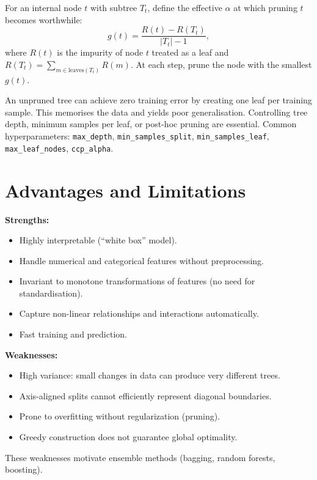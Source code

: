 \begin{proposition}
For an internal node $t$ with subtree $T_t$, define the effective $\alpha$ at which pruning $t$ becomes worthwhile:
\[
    g(t) = \frac{R(t) - R(T_t)}{|T_t| - 1},
\]
where $R(t)$ is the impurity of node $t$ treated as a leaf and $R(T_t) = \sum_{m \in \text{leaves}(T_t)} R(m)$. At each step, prune the node with the smallest $g(t)$.
\end{proposition}

\begin{warning}[title=\textbf{Overfitting Without Pruning}]
An unpruned tree can achieve zero training error by creating one leaf per training sample. This memorises the data and yields poor generalisation. Controlling tree depth, minimum samples per leaf, or post-hoc pruning are essential. Common hyperparameters: \texttt{max\_depth}, \texttt{min\_samples\_split}, \texttt{min\_samples\_leaf}, \texttt{max\_leaf\_nodes}, \texttt{ccp\_alpha}.
\end{warning}

\section{Advantages and Limitations}

\begin{bestpractice}[title=\textbf{Strengths and Weaknesses of Decision Trees}]
\textbf{Strengths:}
\begin{itemize}
    \item Highly interpretable (``white box'' model).
    \item Handle numerical and categorical features without preprocessing.
    \item Invariant to monotone transformations of features (no need for standardisation).
    \item Capture non-linear relationships and interactions automatically.
    \item Fast training and prediction.
\end{itemize}
\textbf{Weaknesses:}
\begin{itemize}
    \item High variance: small changes in data can produce very different trees.
    \item Axis-aligned splits cannot efficiently represent diagonal boundaries.
    \item Prone to overfitting without regularization (pruning).
    \item Greedy construction does not guarantee global optimality.
\end{itemize}
These weaknesses motivate ensemble methods (bagging, random forests, boosting).
\end{bestpractice}

